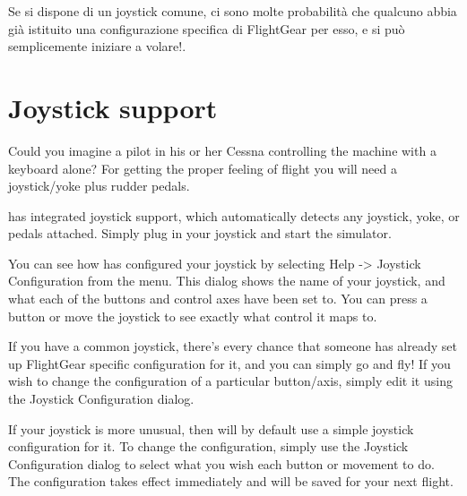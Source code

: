 \begin{itemize}
{  Se si dispone di un joystick comune, ci sono molte probabilit\`{a} che qualcuno abbia gi\`{a} istituito una
  configurazione specifica di FlightGear per esso, e si pu\`{o} semplicemente iniziare a volare!.

}
{
  \section{Joystick support\label{joysticksupp}}
  Could you imagine a pilot in his or her Cessna controlling the machine with
  a keyboard alone? For getting the proper feeling of flight you will need a
  joystick/yoke plus rudder pedals.

  \FlightGear{} has integrated joystick support, which automatically detects
  any joystick, yoke, or pedals attached. Simply plug in your joystick and start
  the simulator.

  You can see how \FlightGear{} has configured your joystick by selecting
  Help -> Joystick Configuration from the menu.  This dialog shows the name
  of your joystick, and what each of the buttons and control axes have been set to.
  You can press a button or move the joystick to see exactly what control it maps to.

  If you have a common joystick, there's every chance that someone has already
  set up FlightGear specific configuration for it, and you can simply go and fly!
  If you wish to change the configuration of a particular button/axis, simply edit
  it using the Joystick Configuration dialog.

  If your joystick is more unusual, then \FlightGear{} will by default use a simple
  joystick configuration for it.  To change the configuration, simply use the Joystick
  Configuration dialog to select what you wish each button or movement to do.  The
  configuration takes effect immediately and will be saved for your next flight.

}
\end{itemize}
